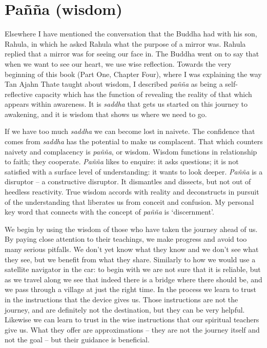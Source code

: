 \section{Pañña (wisdom)}

Elsewhere I have mentioned the conversation that the Buddha had with his
son, Rahula, in which he asked Rahula what the purpose of a mirror was.
Rahula replied that a mirror was for seeing our face in. The Buddha went
on to say that when we want to see our heart, we use wise reflection.
Towards the very beginning of this book (Part One, Chapter Four), where
I was explaining the way Tan Ajahn Thate taught about wisdom, I
described \emph{pañña} as being a self-reflective capacity which has the
function of revealing the reality of that which appears within
awareness. It is \emph{saddha} that gets us started on this journey to
awakening, and it is wisdom that shows us where we need to go.

If we have too much \emph{saddha} we can become lost in naivete. The
confidence that comes from \emph{saddha} has the potential to make us
complacent. That which counters naivety and complacency is \emph{pañña},
or wisdom. Wisdom functions in relationship to faith; they cooperate.
\emph{Pañña} likes to enquire: it asks questions; it is not satisfied
with a surface level of understanding: it wants to look deeper.
\emph{Pañña} is a disruptor -- a constructive disruptor. It dismantles
and dissects, but not out of heedless reactivity. True wisdom accords
with reality and deconstructs in pursuit of the understanding that
liberates us from conceit and confusion. My personal key word that
connects with the concept of \emph{pañña} is `discernment'.

We begin by using the wisdom of those who have taken the journey ahead
of us. By paying close attention to their teachings, we make progress
and avoid too many serious pitfalls. We don't yet know what they know
and we don't see what they see, but we benefit from what they share.
Similarly to how we would use a satellite navigator in the car: to begin
with we are not sure that it is reliable, but as we travel along we see
that indeed there is a bridge where there should be, and we pass through
a village at just the right time. In the process we learn to trust in
the instructions that the device gives us. Those instructions are not
the journey, and are definitely not the destination, but they can be
very helpful. Likewise we can learn to trust in the wise instructions
that our spiritual teachers give us. What they offer are approximations
-- they are not the journey itself and not the goal -- but their
guidance is beneficial.


